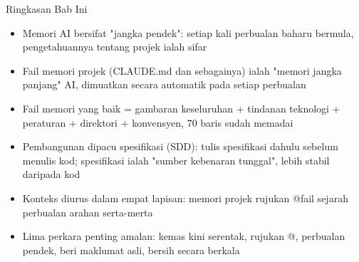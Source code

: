 \begin{tcbsummary}{Ringkasan Bab Ini}
\begin{itemize}
  \item Memori AI bersifat "jangka pendek": setiap kali perbualan baharu bermula, pengetahuannya tentang projek ialah sifar
  \item Fail memori projek (CLAUDE.md dan sebagainya) ialah "memori jangka panjang" AI, dimuatkan secara automatik pada setiap perbualan
  \item Fail memori yang baik = gambaran keseluruhan + tindanan teknologi + peraturan + direktori + konvensyen, 70 baris sudah memadai
  \item Pembangunan dipacu spesifikasi (SDD): tulis spesifikasi dahulu sebelum menulis kod; spesifikasi ialah "sumber kebenaran tunggal", lebih stabil daripada kod
  \item Konteks diurus dalam empat lapisan: memori projek rujukan @fail sejarah perbualan arahan serta-merta
  \item Lima perkara penting amalan: kemas kini serentak, rujukan @, perbualan pendek, beri maklumat asli, bersih secara berkala
\end{itemize}

\end{tcbsummary}
